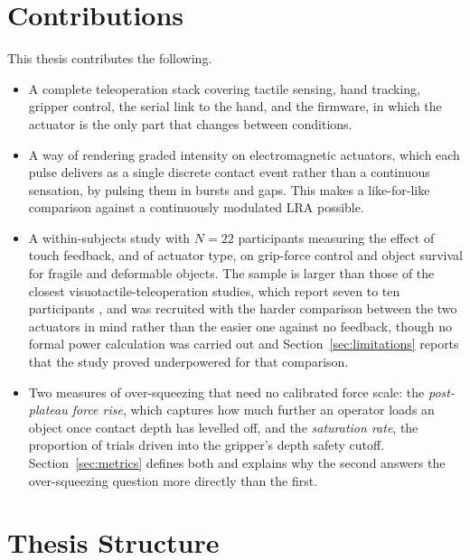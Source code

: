 \documentclass[12pt, a4paper, twoside, openright]{report}
\begin{document}
\section{Contributions}
\label{sec:contributions}

This thesis contributes the following.

\begin{itemize}
    \item A complete teleoperation stack covering tactile sensing, hand
          tracking, gripper control, the serial link to the hand, and the
          firmware, in which the actuator is the only part that changes between
          conditions.
    \item A way of rendering graded intensity on electromagnetic actuators,
          which each pulse delivers as a single discrete contact event rather
          than a continuous sensation, by pulsing them in bursts and gaps.
          This makes a like-for-like comparison against a continuously
          modulated LRA possible.
    \item A within-subjects study with $N=22$ participants measuring the effect
          of touch feedback, and of actuator type, on grip-force control and
          object survival for fragile and deformable objects. The sample is
          larger than those of the closest visuotactile-teleoperation studies,
          which report seven to ten participants
          \cite{becker2024,coppola2022}, and was recruited with the harder
          comparison between the two actuators in mind rather than the easier
          one against no feedback, though no formal power calculation was
          carried out and Section~\ref{sec:limitations} reports that the study
          proved underpowered for that comparison.
    \item Two measures of over-squeezing that need no calibrated force scale:
          the \emph{post-plateau force rise}, which captures how much further
          an operator loads an object once contact depth has levelled off, and
          the \emph{saturation rate}, the proportion of trials driven into the
          gripper's depth safety cutoff. Section~\ref{sec:metrics} defines both
          and explains why the second answers the over-squeezing question more
          directly than the first.
\end{itemize}

\section{Thesis Structure}
\label{sec:structure}
\end{document}
